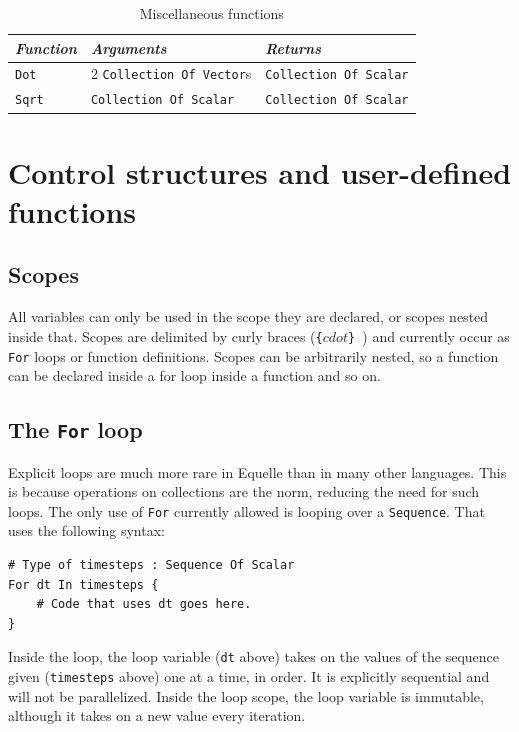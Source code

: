 \documentclass[11pt]{article}
\newcommand{\code}[1]{\texttt{#1}}
\begin{document}
\begin{table}
\begin{tabular}{l|l|l}
{\em Function} & {\em Arguments} & {\em Returns} \\
\hline
\code{Dot} & 2 \code{Collection Of Vector}s & \code{Collection Of Scalar} \\
\code{Sqrt} & \code{Collection Of Scalar} & \code{Collection Of Scalar} \\
\end{tabular}
\caption{Miscellaneous functions}
\label{tab:miscfunc}
\end{table}

\section{Control structures and user-defined functions}

\subsection{Scopes}

All variables can only be used in the scope they are declared, or scopes nested inside
that. Scopes are delimited by curly braces (\code{\{$cdot$\} }) and currently occur as
\code{For} loops or function definitions. Scopes can be arbitrarily nested, so a function
can be declared inside a for loop inside a function and so on.

\subsection{The \code{For} loop}

Explicit loops are much more rare in Equelle than in many other languages. This is because
operations on collections are the norm, reducing the need for such loops. The only use of
\code{For} currently allowed is looping over a \code{Sequence}. That uses the following
syntax:

\begin{verbatim}
# Type of timesteps : Sequence Of Scalar
For dt In timesteps {
    # Code that uses dt goes here.
}
\end{verbatim}

Inside the loop, the loop variable (\code{dt} above) takes on the values of the sequence
given (\code{timesteps} above) one at a time, in order. It is explicitly sequential and
will not be parallelized. Inside the loop scope, the loop variable is immutable, although
it takes on a new value every iteration.
\end{document}
